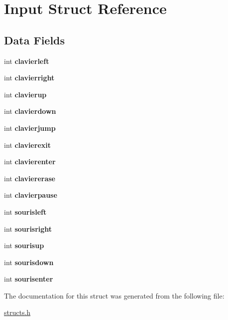 \hypertarget{structInput}{}\section{Input Struct Reference}
\label{structInput}
\subsection*{Data Fields}
\begin{DoxyCompactItemize}
\item 
\mbox{\label{structInput_aeaf5067d7fc665247d4eba7d3d181bef}} 
int {\bfseries clavierleft}
\item 
\mbox{\label{structInput_a935c14814689d5340fdac096435c6127}} 
int {\bfseries clavierright}
\item 
\mbox{\label{structInput_a2daf2227958da5222592388880ec3050}} 
int {\bfseries clavierup}
\item 
\mbox{\label{structInput_aefd7cc33a083b400e9b71422499a747c}} 
int {\bfseries clavierdown}
\item 
\mbox{\label{structInput_ab454c745d1190153e332961a63140851}} 
int {\bfseries clavierjump}
\item 
\mbox{\label{structInput_aab6e18ce10ce4f2ba1eaced59839448f}} 
int {\bfseries clavierexit}
\item 
\mbox{\label{structInput_a3bcf7c6ae1155ab2f63adaad72bdabe9}} 
int {\bfseries clavierenter}
\item 
\mbox{\label{structInput_a14144e9986d77e00c0f2c6328ca2ccb3}} 
int {\bfseries claviererase}
\item 
\mbox{\label{structInput_a1e1b5aa1637eb66692fef8ffb547fec5}} 
int {\bfseries clavierpause}
\item 
\mbox{\label{structInput_a5d2b313ca0413ad46b46da4c40e90abd}} 
int {\bfseries sourisleft}
\item 
\mbox{\label{structInput_af62d3d74553af73f821d8e343b279895}} 
int {\bfseries sourisright}
\item 
\mbox{\label{structInput_a37b4a1674047d38b1a4bbe4ad9344dbe}} 
int {\bfseries sourisup}
\item 
\mbox{\label{structInput_acca1a102f431453e2e2328b2ad2e8d2e}} 
int {\bfseries sourisdown}
\item 
\mbox{\label{structInput_aa68edb9b490614b8e451638ce5242956}} 
int {\bfseries sourisenter}
\end{DoxyCompactItemize}


The documentation for this struct was generated from the following file\+:\begin{DoxyCompactItemize}
\item 
\hyperlink{structs_8h}{structs.\+h}\end{DoxyCompactItemize}
